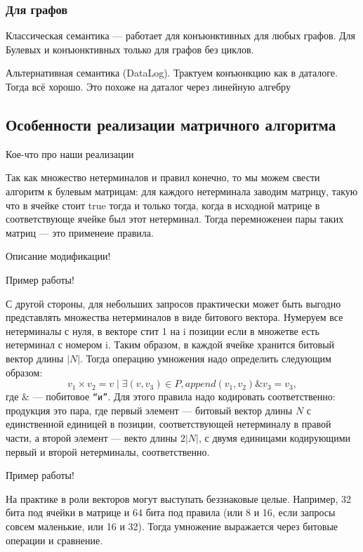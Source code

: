 \subsubsection{Для графов}

Классическая семантика --- работает для конъюнктивных для любых графов.
Для Булевых и конъюнктивных только для графов без циклов.

Альтернативная семантика (DataLog).
Трактуем конъюнкцию как в даталоге. Тогда всё хорошо.
Это похоже на даталог через линейную алгебру~\cite{!!!}

\subsection{Особенности реализации матричного алгоритма}

Кое-что про наши реализации~\cite{Mishin:2019:ECP:3327964.3328503}

Так как множество нетерминалов и правил конечно, то мы можем свести алгоритм к булевым матрицам: для каждого нетерминала заводим матрицу, такую что в ячейке стоит true тогда и только тогда, когда в исходной матрице в соответствующе ячейке был этот нетерминал.
Тогда перемноженеи пары таких матриц --- это применеие правила.

Описание модификации!

\begin{example}
Пример работы!
\end{example}

С другой стороны, для небольших запросов практически может быть выгодно представлять множества нетерминалов в виде битового вектора.
Нумеруем все нетерминалы с нуля, в векторе стит 1 на i позиции если в множетве есть нетерминал с номером i.
Таким образом, в каждой ячейке хранится битовый вектор длины $|N|$.
Тогда операцию умножения надо определить следующим образом:
$$v_1 \times v_2 = v \mid \exists (v,v_3) \in P, \textit{append}(v_1, v_2) \& v_3 = v_3,$$ где $\&$ --- побитовое \texttt{``и''}.
Для этого правила надо кодировать соответственно: продукция это пара, где первый элемент --- битовый вектор длины $N$ с единственной единицей в позиции, соответствующей нетерминалу в правой части, а второй элемент --- векто длины $2|N|$, с двумя единицами кодирующими первый и второй нетерминалы, соответственно.

\begin{example}
Пример работы!
\end{example}


На практике в роли векторов могут выступать беззнаковые целые. 
Например, 32 бита под ячейки в матрице и 64 бита под правила (или 8 и 16, если запросы совсем маленькие, или 16 и 32).
Тогда умножение выражается через битовые операции и сравнение.



